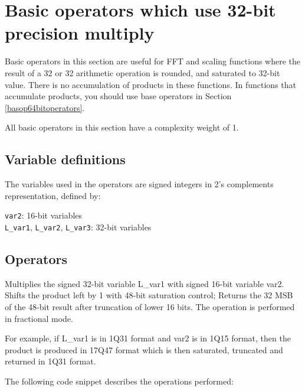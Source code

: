\section{Basic operators which use 32-bit precision multiply}

Basic operators in this section are useful for FFT and scaling functions where the result of a 32 or 32 arithmetic operation is rounded, and saturated to 32-bit value.
There is no accumulation of products in these functions.
In functions that accumulate products, you should use base operators in Section \ref{basop64bitoperators}.

All basic operators in this section have a complexity weight of 1.

\subsection{Variable definitions}

The variables used in the operators are signed integers in 2's complements representation, defined by:

{\tt var2}: 16-bit variables\\
{\tt L\_var1}, {\tt L\_var2}, {\tt L\_var3}: 32-bit variables


\subsection{Operators}


Multiplies the signed 32-bit variable L\_var1 with signed 16-bit variable var2.
Shifts the product left by 1 with 48-bit saturation control;
Returns the 32 MSB of the 48-bit result after truncation of lower 16 bits.
The operation is performed in fractional mode.

For example, if L\_var1 is in 1Q31 format and var2 is in 1Q15 format, then the product is produced in 17Q47 format which is then saturated, truncated and returned in 1Q31 format.

The following code snippet describes the operations performed:

\\



